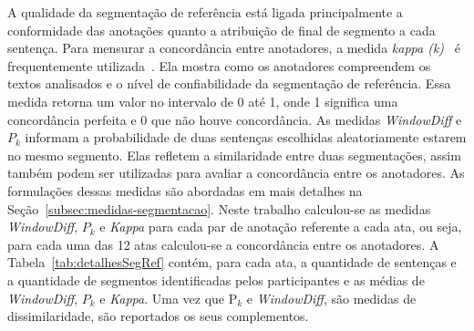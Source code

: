 A qualidade da segmentação de referência está ligada principalmente a conformidade das anotações quanto a atribuição de final de segmento a cada sentença.
Para mensurar a concordância entre anotadores, a medida \textit{kappa (k)}~\cite{Carletta1996} é frequentemente utilizada~\cite{Gruenstein2007, Cardoso2017, Hearst1997}. Ela mostra como os anotadores compreendem os textos analisados e o nível de confiabilidade da segmentação de referência. Essa medida retorna um valor no intervalo de 0 até 1, onde 1 significa uma concordância perfeita e 0 que não houve concordância. 
As medidas \textit{WindowDiff} e $P_k$ informam a probabilidade de duas sentenças escolhidas aleatoriamente estarem no mesmo segmento. Elas refletem a similaridade entre duas segmentações, assim também podem ser utilizadas para avaliar a concordância entre os anotadores. As formulações dessas medidas são abordadas em mais detalhes na Seção~\ref{subsec:medidas-segmentacao}.
%
%
Neste trabalho calculou-se as medidas \textit{WindowDiff}, $P_k$ e \textit{Kappa} para cada par de anotação referente a cada ata, ou seja, para cada uma das 12 atas calculou-se a concordância entre os anotadores.  
A Tabela~\ref{tab:detalhesSegRef} contém, para cada ata, a quantidade de sentenças e a quantidade de segmentos identificadas pelos participantes e as médias de \textit{WindowDiff}, $P_k$ e \textit{Kappa}. Uma vez que P$_k$ e \textit{WindowDiff}, são medidas de dissimilaridade, são reportados os seus complementos.








